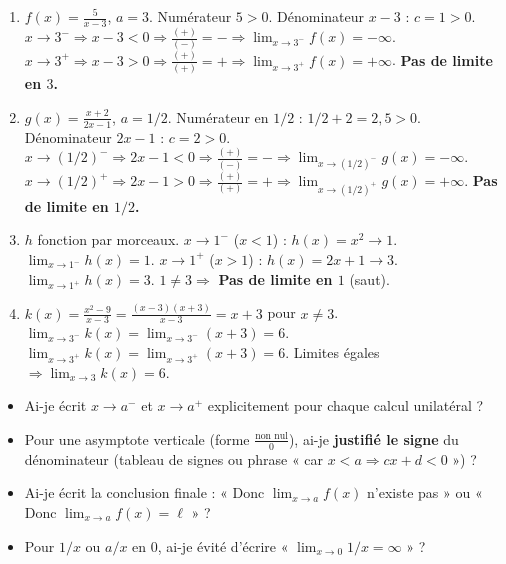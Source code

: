 \documentclass[11pt]{article}
\begin{document}
\begin{corrige}[Exercice n°1]
\begin{enumerate}
    \item $f(x)=\frac{5}{x-3}$, $a=3$. Numérateur $5>0$. Dénominateur $x-3$ : $c=1>0$.
    $x\to 3^{-} \Rightarrow x-3<0 \Rightarrow \frac{(+)}{(-)}=- \Rightarrow \lim_{x\to 3^{-}} f(x)=-\infty$.
    $x\to 3^{+} \Rightarrow x-3>0 \Rightarrow \frac{(+)}{(+)}=+ \Rightarrow \lim_{x\to 3^{+}} f(x)=+\infty$.
    \textbf{Pas de limite en $3$.}
    \item $g(x)=\frac{x+2}{2x-1}$, $a=1/2$. Numérateur en $1/2$ : $1/2+2 = 2,5 > 0$. Dénominateur $2x-1$ : $c=2>0$.
    $x\to (1/2)^{-} \Rightarrow 2x-1<0 \Rightarrow \frac{(+)}{(-)}=- \Rightarrow \lim_{x\to (1/2)^{-}} g(x)=-\infty$.
    $x\to (1/2)^{+} \Rightarrow 2x-1>0 \Rightarrow \frac{(+)}{(+)}=+ \Rightarrow \lim_{x\to (1/2)^{+}} g(x)=+\infty$.
    \textbf{Pas de limite en $1/2$.}
    \item $h$ fonction par morceaux.
    $x\to 1^{-}$ ($x<1$) : $h(x)=x^2 \to 1$. $\lim_{x\to 1^{-}} h(x) = 1$.
    $x\to 1^{+}$ ($x>1$) : $h(x)=2x+1 \to 3$. $\lim_{x\to 1^{+}} h(x) = 3$.
    $1 \neq 3 \Rightarrow$ \textbf{Pas de limite en $1$} (saut).
    \item $k(x)=\frac{x^2-9}{x-3}=\frac{(x-3)(x+3)}{x-3}=x+3$ pour $x\neq 3$.
    $\lim_{x\to 3^{-}} k(x) = \lim_{x\to 3^{-}} (x+3) = 6$.
    $\lim_{x\to 3^{+}} k(x) = \lim_{x\to 3^{+}} (x+3) = 6$.
    Limites égales $\Rightarrow \lim_{x\to 3} k(x) = 6$.
\end{enumerate}
\end{corrige}

\begin{attention}
\begin{itemize}
    \item [ ] Ai-je écrit \textbf{$x \to a^{-}$} et \textbf{$x \to a^{+}$} explicitement pour chaque calcul unilatéral ?
    \item [ ] Pour une asymptote verticale (forme $\frac{\text{non nul}}{0}$), ai-je \textbf{justifié le signe} du dénominateur (tableau de signes ou phrase « car $x<a \Rightarrow cx+d<0$ ») ?
    \item [ ] Ai-je écrit la conclusion finale : « Donc $\lim_{x\to a} f(x)$ n'existe pas » ou « Donc $\lim_{x\to a} f(x) = \ell$ » ?
    \item [ ] Pour $1/x$ ou $a/x$ en $0$, ai-je évité d'écrire « $\lim_{x\to 0} 1/x = \infty$ » ?
\end{itemize}
\end{attention}
\end{document}
